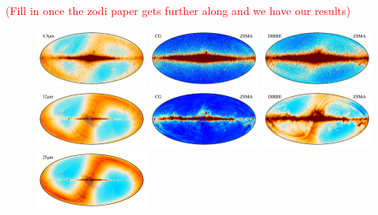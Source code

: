 \documentclass{aa}
\begin{document}
\textcolor{red}{(Fill in once the zodi paper gets further along and we have our results)}
\begin{figure}
    \centering
    \includegraphics[width=0.325\textwidth]{figs/zsma_compare/cosmoglobe_ma_04.pdf}
    \includegraphics[width=0.325\textwidth]{figs/zsma_compare/cosmoglobe_zsma_04.pdf}
    \includegraphics[width=0.325\textwidth]{figs/zsma_compare/dirbe_zsma_04.pdf}\\
    \includegraphics[width=0.325\textwidth]{figs/zsma_compare/cosmoglobe_ma_05.pdf}
    \includegraphics[width=0.325\textwidth]{figs/zsma_compare/cosmoglobe_zsma_05.pdf}
    \includegraphics[width=0.325\textwidth]{figs/zsma_compare/dirbe_zsma_05.pdf}\\
    \includegraphics[width=0.325\textwidth]{figs/zsma_compare/cosmoglobe_ma_06.pdf}

\end{figure}
\end{document}

